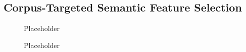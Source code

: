 \subsection{Corpus-Targeted Semantic Feature Selection}
\begin{figure}
    \centering
    \caption[French  Regressor Variances]{Placeholder} 
    \label{fig:freMIXRegVar}
\end{figure}
\begin{figure}
    \centering
    \caption[French  Regressor Variances]{Placeholder} 
    \label{fig:freSIGRegVar}
\end{figure}


